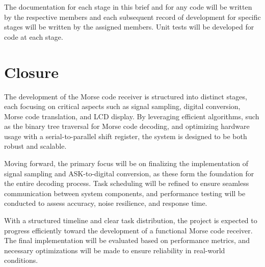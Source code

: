\documentclass{cce2014-design}
\begin{document}
The documentation for each stage in this brief and for any code will be written by the respective members and each subsequent record of development for specific stages will be written by the assigned members. Unit tests will be developed for code at each stage.


\section{Closure}
The development of the Morse code receiver is structured into distinct stages, each focusing on critical aspects such as signal sampling, digital conversion, Morse code translation, and LCD display. By leveraging efficient algorithms, such as the binary tree traversal for Morse code decoding, and optimizing hardware usage with a serial-to-parallel shift register, the system is designed to be both robust and scalable.

Moving forward, the primary focus will be on finalizing the implementation of signal sampling and ASK-to-digital conversion, as these form the foundation for the entire decoding process. Task scheduling will be refined to ensure seamless communication between system components, and performance testing will be conducted to assess accuracy, noise resilience, and response time.

With a structured timeline and clear task distribution, the project is expected to progress efficiently toward the development of a functional Morse code receiver. The final implementation will be evaluated based on performance metrics, and necessary optimizations will be made to ensure reliability in real-world conditions.






\begin{bibliography}

\end{bibliography}
\end{document}
